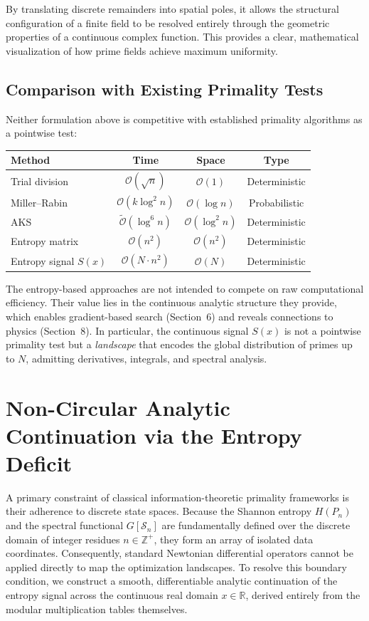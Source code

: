 \documentclass[11pt,twoside]{article}
\begin{document}
	By translating discrete remainders into spatial poles, it allows the structural configuration of a finite field to be resolved entirely through the geometric properties of a continuous complex function. This provides a clear, mathematical visualization of how prime fields achieve maximum uniformity.
	
	\subsection{Comparison with Existing Primality Tests}
	Neither formulation above is competitive with established primality algorithms as a pointwise test:
	
	\begin{center}
	\begin{tabular}{l c c c}
		\hline
		\textbf{Method} & \textbf{Time} & \textbf{Space} & \textbf{Type} \\
		\hline
		Trial division & $\mathcal{O}(\sqrt{n})$ & $\mathcal{O}(1)$ & Deterministic \\
		Miller--Rabin & $\mathcal{O}(k \log^2 n)$ & $\mathcal{O}(\log n)$ & Probabilistic \\
		AKS & $\tilde{\mathcal{O}}(\log^6 n)$ & $\mathcal{O}(\log^2 n)$ & Deterministic \\
		Entropy matrix & $\mathcal{O}(n^2)$ & $\mathcal{O}(n^2)$ & Deterministic \\
		Entropy signal $S(x)$ & $\mathcal{O}(N \cdot n^2)$ & $\mathcal{O}(N)$ & Deterministic \\
		\hline
	\end{tabular}
	\end{center}
	
	\noindent The entropy-based approaches are not intended to compete on raw computational efficiency. Their value lies in the continuous analytic structure they provide, which enables gradient-based search (Section~6) and reveals connections to physics (Section~8). In particular, the continuous signal $S(x)$ is not a pointwise primality test but a \emph{landscape} that encodes the global distribution of primes up to $N$, admitting derivatives, integrals, and spectral analysis.
	
	\section{Non-Circular Analytic Continuation via the Entropy Deficit}
	
	A primary constraint of classical information-theoretic primality frameworks is their adherence to discrete state spaces. Because the Shannon entropy $H(P_n)$ and the spectral functional $G[\mathcal{S}_n]$ are fundamentally defined over the discrete domain of integer residues $n \in \mathbb{Z}^+$, they form an array of isolated data coordinates. Consequently, standard Newtonian differential operators cannot be applied directly to map the optimization landscapes. To resolve this boundary condition, we construct a smooth, differentiable analytic continuation of the entropy signal across the continuous real domain $x \in \mathbb{R}$, derived entirely from the modular multiplication tables themselves.
	
\end{document}
